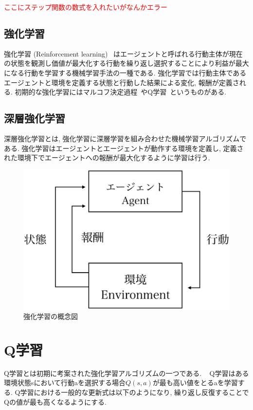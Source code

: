 \textcolor{red}{ここにステップ関数の数式を入れたいがなんかエラー}


\subsection{強化学習}

強化学習 (Reinforcement learning) ~\cite{ReinforcementLearning}はエージェントと呼ばれる行動主体が現在の状態を観測し価値が最大化する行動を繰り返し選択することにより利益が最大になる行動を学習する機械学習手法の一種である.
強化学習では行動主体であるエージェントと環境を定義する状態と行動した結果による変化, 報酬が定義される.
初期的な強化学習にはマルコフ決定過程~\cite{ReinforcementLearning}やQ学習~\cite{QL}というものがある.

\subsection{深層強化学習}

深層強化学習とは, 強化学習に深層学習を組み合わせた機械学習アルゴリズムである.
強化学習はエージェントとエージェントが動作する環境を定義し, 定義された環境下でエージェントへの報酬が最大化するように学習は行う.

\begin{figure}[H]
    \centering
    \includegraphics[clip,width = 12.0cm]{assets/reinforcement_learning.eps}
    \caption{強化学習の概念図}  \label{ReinforcementLearningPic}
\end{figure}

\section{Q学習}

Q学習とは初期に考案された強化学習アルゴリズムの一つである. ~\cite{QL}
Q学習はある環境状態sにおいて行動aを選択する場合$ Q(s, a)$が最も高い値をとるaを学習する. Q学習における一般的な更新式は以下のようになり, 繰り返し反復することで
Qの値が最も高くなるようにする.


